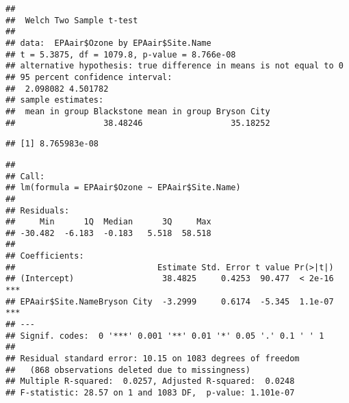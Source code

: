 \documentclass[]{article}
\newenvironment{Shaded}{\begin{snugshade}}{\end{snugshade}}
\newcommand{\KeywordTok}[1]{\textcolor[rgb]{0.13,0.29,0.53}{\textbf{#1}}}
\newcommand{\StringTok}[1]{\textcolor[rgb]{0.31,0.60,0.02}{#1}}
\newcommand{\CommentTok}[1]{\textcolor[rgb]{0.56,0.35,0.01}{\textit{#1}}}
\newcommand{\OperatorTok}[1]{\textcolor[rgb]{0.81,0.36,0.00}{\textbf{#1}}}
\newcommand{\NormalTok}[1]{#1}
\begin{document}
\begin{verbatim}
## 
##  Welch Two Sample t-test
## 
## data:  EPAair$Ozone by EPAair$Site.Name
## t = 5.3875, df = 1079.8, p-value = 8.766e-08
## alternative hypothesis: true difference in means is not equal to 0
## 95 percent confidence interval:
##  2.098082 4.501782
## sample estimates:
##  mean in group Blackstone mean in group Bryson City 
##                  38.48246                  35.18252
\end{verbatim}

\begin{Shaded}
\end{Shaded}

\begin{verbatim}
## [1] 8.765983e-08
\end{verbatim}

\begin{Shaded}
\end{Shaded}

\begin{verbatim}
## 
## Call:
## lm(formula = EPAair$Ozone ~ EPAair$Site.Name)
## 
## Residuals:
##     Min      1Q  Median      3Q     Max 
## -30.482  -6.183  -0.183   5.518  58.518 
## 
## Coefficients:
##                             Estimate Std. Error t value Pr(>|t|)    
## (Intercept)                  38.4825     0.4253  90.477  < 2e-16 ***
## EPAair$Site.NameBryson City  -3.2999     0.6174  -5.345  1.1e-07 ***
## ---
## Signif. codes:  0 '***' 0.001 '**' 0.01 '*' 0.05 '.' 0.1 ' ' 1
## 
## Residual standard error: 10.15 on 1083 degrees of freedom
##   (868 observations deleted due to missingness)
## Multiple R-squared:  0.0257, Adjusted R-squared:  0.0248 
## F-statistic: 28.57 on 1 and 1083 DF,  p-value: 1.101e-07
\end{verbatim}
\end{document}
